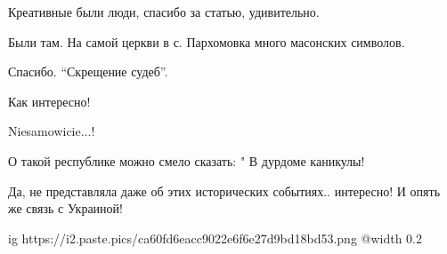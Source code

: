 \begin{itemize}
Креативные были люди, спасибо за статью, удивительно.

Были там. На самой церкви в с. Пархомовка много масонских символов.

Спасибо. \enquote{Скрещение судеб}.


Как интересно!

Niesamowicie...!

О такой республике можно смело сказать: " В дурдоме каникулы!

Да, не представляла даже об этих исторических событиях.. интересно! И опять же связь с Украиной!


\ifcmt
  ig https://i2.paste.pics/ca60fd6eacc9022e6f6e27d9bd18bd53.png
  @width 0.2
\fi

\end{itemize} %

